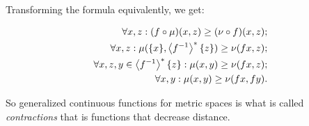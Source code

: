 Transforming the formula equivalently, we get:

\begin{align*}
\forall x,z: (f\circ\mu)(x,z)\geq(\nu\circ f)(x,z);\\
\forall x,z: \mu(\{x\},\left\langle f^{-1}\right\rangle ^{\ast}\{z\})\geq\nu(fx,z);\\
\forall x,z,y\in\left\langle f^{-1}\right\rangle ^{\ast}\{z\}: \mu(x,y)\geq\nu(fx,z);\\
\forall x,y: \mu(x,y)\geq\nu(fx,fy).
\end{align*}

So generalized continuous functions for metric spaces is what is called \emph{contractions} that is functions that decrease distance.
